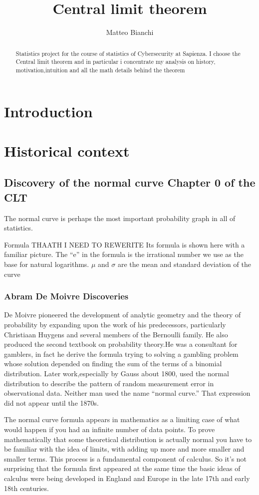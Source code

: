 \documentclass{article}
\title{Central limit theorem}
\author{Matteo Bianchi}
\begin{document}
\maketitle

\begin{abstract}
Statistics project for the course of statistics of Cybersecurity at Sapienza.
I choose the Central limit theorem and in particular i concentrate my analysis  on  history, motivation,intuition and  all the math details behind the theorem
\end{abstract}

\section{Introduction}

\section{Historical context}
\subsection{Discovery of the normal curve Chapter 0 of the CLT}
The normal curve is perhaps the most important probability graph in all of statistics.

Formula THAATH I NEED TO REWERITE
Its formula is shown here with a
familiar picture. The “e” in the formula
is the irrational number we use as the
  base for natural logarithms. $ \mu $ and $ \sigma $ are
the mean and standard deviation of the
curve

\subsubsection{Abram De Moivre Discoveries}
De Moivre pioneered the development of analytic geometry and the theory of probability by expanding upon the work of his predecessors, particularly Christiaan Huygens and several members of the Bernoulli family. He also produced the second textbook on probability theory.He was a consultant for  gamblers, in fact he derive the formula trying to  solving a gambling
problem whose solution depended on finding the sum of the terms of a binomial distribution. Later work,especially by Gauss about 1800, used the normal distribution to describe the pattern of random
measurement error in observational data. Neither man used the name “normal curve.” That expression did not appear until the 1870s.


The normal curve formula appears in mathematics as a limiting case of what would happen if you had an
infinite number of data points. To prove mathematically that some theoretical distribution is actually
normal you have to be familiar with the idea of limits, with adding up more and more smaller and smaller
terms. This process is a fundamental component of calculus. So it’s not surprising that the formula first
appeared at the same time the basic ideas of calculus were being developed in England and Europe in the
late 17th and early 18th centuries.
\end{document}
